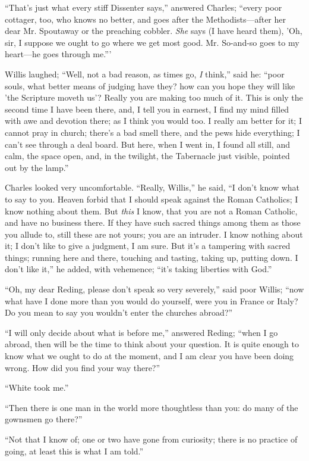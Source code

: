 ``That's just what every stiff Dissenter says,'' answered
Charles; ``every poor cottager, too, who knows no better, and goes
after the Methodists—after her dear Mr. Spoutaway or the preaching
cobbler. \emph{She} says (I have heard them), 'Oh, sir, I suppose we
ought to go where we get most good. Mr. So-and-so goes to my heart—he
goes through me.'''

Willis laughed; ``Well, not a bad reason, as times go, \emph{I}
think,'' said he: ``poor souls, what better means of judging
have they? how can you hope they will like 'the Scripture moveth us'?
Really you are making too much of it. This is only the second time I
have been there, and, I tell you in earnest, I find my mind filled
with awe and devotion there; as I think you would too. I really am
better for it; I cannot pray in church; there's a bad smell there, and
the pews hide everything; I can't see through a deal board. But here, when I went in, I found all still, and calm, the space open,
and, in the twilight, the Tabernacle just visible, pointed out by the
lamp.''

Charles looked very uncomfortable. ``Really, Willis,'' he
said, ``I don't know what to say to you. Heaven forbid that I
should speak against the Roman Catholics; I know nothing about them.
But \emph{this} I know, that you are not a Roman Catholic, and have no
business there. If they have such sacred things among them as those
you allude to, still these are not yours; you are an intruder. I know
nothing about it; I don't like to give a judgment, I am sure. But it's
a tampering with sacred things; running here and there, touching and
tasting, taking up, putting down. I don't like it,'' he added,
with vehemence; ``it's taking liberties with God.''

``Oh, my dear Reding, please don't speak so very
severely,'' said poor Willis; ``now what have I done more than
you would do yourself, were you in France or Italy? Do you mean to say
you wouldn't enter the churches abroad?''

``I will only decide about what is before me,'' answered
Reding; ``when I go abroad, then will be the time to think about
your question. It is quite enough to know what we ought to do at the
moment, and I am clear you have been doing wrong. How did you find
your way there?''

``White took me.''

``Then there is one man in the world more thoughtless than you:
do many of the gownsmen go there?''

``Not that I know of; one or two have gone from curiosity;
there is no practice of going, at least this is what I am told.''

